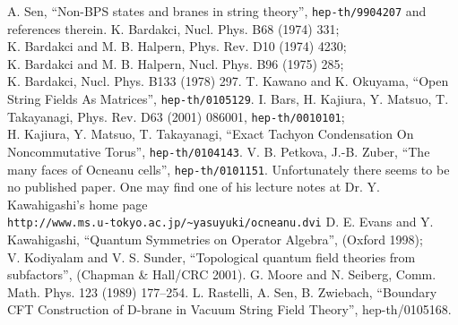 \documentclass[a4paper,12pt]{article}
\begin{document}
\begin{thebibliography}{99}
 A. Sen, ``Non-BPS states and branes in string theory'',
{\tt hep-th/9904207} and references therein.
 K. Bardakci, Nucl. Phys. B68 (1974) 331;\\
K. Bardakci and M. B. Halpern, Phys. Rev. D10 (1974) 4230;\\
K. Bardakci and M. B. Halpern, Nucl. Phys. B96 (1975) 285;\\
K. Bardakci, Nucl. Phys. B133 (1978) 297.
 T. Kawano and K. Okuyama,
``Open String Fields As Matrices'', {\tt hep-th/0105129}.
 I. Bars, H. Kajiura, Y. Matsuo, T. Takayanagi,
Phys. Rev. D63 (2001) 086001,
{\tt hep-th/0010101};\\
H. Kajiura, Y. Matsuo, T. Takayanagi,
``Exact Tachyon Condensation On Noncommutative Torus'',
{\tt hep-th/0104143}.
 V. B. Petkova, J.-B. Zuber, 
``The many faces of Ocneanu cells'',
{\tt hep-th/0101151}.
 Unfortunately there seems to be no published paper.
One may find one of his lecture notes at Dr. Y. Kawahigashi's home page\\
{\tt http://www.ms.u-tokyo.ac.jp/\textasciitilde{}yasuyuki/ocneanu.dvi}
 D. E. Evans and Y. Kawahigashi,
``Quantum Symmetries on Operator Algebra'', (Oxford 1998);\\
V. Kodiyalam and V. S. Sunder, ``Topological quantum field
theories from subfactors'', (Chapman \& Hall/CRC 2001).
 G. Moore and N. Seiberg, 
Comm. Math. Phys. 123 (1989) 177--254.
 L. Rastelli, A. Sen, B. Zwiebach,
``Boundary CFT Construction of D-brane in Vacuum String
Field Theory'', hep-th/0105168.
\end{thebibliography}
\end{document}
